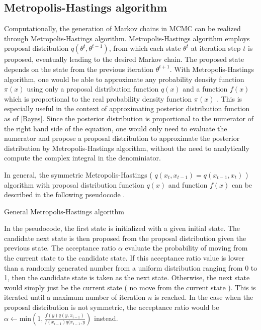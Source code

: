 \documentclass{usiinftr}
\begin{document}
\subsection{Metropolis-Hastings algorithm}
Computationally, the generation of Markov chains in MCMC can be realized through Metropolis-Hastings algorithm. Metropolis-Hastings algorithm employs proposal distribution $q(\theta^{t},\theta^{t-1})$, from which each state $\theta^{t}$ at iteration step $t$ is proposed, eventually leading to the desired Markov chain. The proposed state depends on the state from the previous iteration $\theta^{t+1}$. With Metropolis-Hastings algorithm, one would be able to approximate any probability density function $\pi(x)$ using only a proposal distribution function $q(x)$ and a function $f(x)$ which is proportional to the real probability density function $\pi(x)$ \cite{28}.  This is especially useful in the context of approximating posterior distribution function as of \ref{Bayes}. Since the posterior distribution is proportional to the numerator of the right hand side of the equation, one would only need to evaluate the numerator and propose a proposal distribution to approximate the posterior distribution by Metropolis-Hastings algorithm, without the need to analytically compute the complex integral in the denominiator.

In general, the symmetric Metropolis-Hastings ( $q(x_t,x_{t-1}) = q(x_{t-1},x_t)$ ) algorithm with proposal distribution function $q(x)$ and function $f(x)$ can be described in the following pseudocode \cite{21}.

\begin{algorithm}
  \caption{General Metropolis-Hastings algorithm} \label{algMH}
  \begin{algorithmic}[1]
    \Statex
        \Else
        \EndIf
    \EndFor
    \State {}
    \EndFunction
  \end{algorithmic}
\end{algorithm}

In the pseudocode, the first state is initialized with a given initial state. The candidate next state is then proposed from the proposal distribution given the previous state. The acceptance ratio $\alpha$ evaluate the probability of moving from the current state to the candidate state. If this acceptance ratio value is lower than a randomly generated number from a uniform distribution ranging from 0 to 1, then the candidate state is taken as the next state. Otherwise, the next state would simply just be the current state ( no move from the current state ). This is iterated until a maximum number of iteration $n$ is reached. In the case when the proposal distribution is not symmetric, the acceptance ratio would be $ \alpha \gets \textrm{min}\left(1, \frac{f(y)q(y,x_{i-1})}{f(x_{i-1})q(x_{i-1},y}\right)$ instead. 
\end{document}
